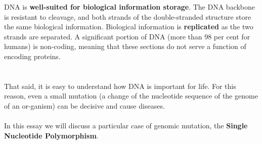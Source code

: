DNA is \textbf{well-suited for biological information storage}. The DNA backbone is resistant to cleavage, and both strands of the double-stranded structure store the same biological information. Biological information is \textbf{replicated} as the two strands are separated. A significant portion of DNA (more than 98 per cent for humans) is non-coding, meaning that these sections do not serve a function of encoding proteins.
\\
\\
\\That said, it is easy to understand how DNA is important for life. For this reason, even a small mutation (a change of the nucleotide sequence of the genome of an or-ganism) can be decisive and cause diseases.
\\
\\In this essay we will discuss a particular case of genomic mutation, the \textbf{Single Nucleotide Polymorphism}.